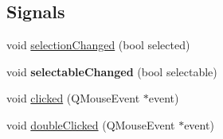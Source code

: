 \subsection*{Signals}
\begin{DoxyCompactItemize}
\item 
void \hyperlink{classQCPTextElement_a49f45b87ee9c1fe866c2cdd12af17a9a}{selection\+Changed} (bool selected)
\item 
\mbox{\label{classQCPTextElement_ac4567260b52d02bfbad63357d13986c5}} 
void {\bfseries selectable\+Changed} (bool selectable)
\item 
void \hyperlink{classQCPTextElement_ad2246a0e701c0655623f048737298334}{clicked} (Q\+Mouse\+Event $\ast$event)
\item 
void \hyperlink{classQCPTextElement_a9c6fd27ae8a7c3a02df7a6bbd3509e40}{double\+Clicked} (Q\+Mouse\+Event $\ast$event)
\end{DoxyCompactItemize}
